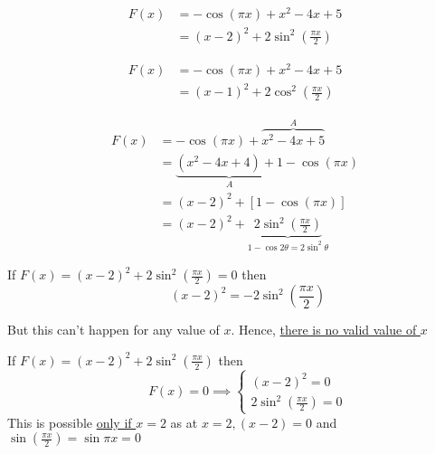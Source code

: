 \documentclass[14pt,fleqn]{extarticle}
\newcommand\expb{ \left(x-2 \right)^2 + 2\sin^2 \left(\frac{\pi x}{2} \right)}
\begin{document}
\begin{problem}
\begin{step}
  \begin{options} 
     \correct 
       \begin{align}
	F(x) &= -\cos \left(\pi x \right) + x^2 - 4x + 5 \\
	&= \left(x-2 \right)^2 + 2\sin^2 \left(\frac{\pi x}{2} \right)
\end{align}

\incorrect 

 \begin{align}
	F(x) &= -\cos \left(\pi x \right) + x^2 - 4x + 5 \\
	&= \left(x-1 \right)^2 + 2\cos^2 \left(\frac{\pi x}{2} \right)
\end{align}
        
    \end{options} 
     \reason 
       
       \begin{align}
       F(x) &=  -\cos \left(\pi x \right) + \overbrace{x^2 - 4x + 5}^{A} \\
       &= \underbrace{\left(x^2-4x+4 \right) + 1}_{A} -\cos \left(\pi x \right) \\
       &= \left(x-2 \right)^2 + \left[1-\cos \left(\pi x \right) \right] \\
       &= \left(x-2 \right)^2 + \underbrace{2\sin^2 \left(\frac{\pi x}{2} \right)}_{1-\cos 2\theta = 2\sin^2\theta}
\end{align}
\end{step}

\begin{step}
  \begin{options} 
       
     \incorrect 
     
     If $F(x) = \expb = 0$ then 
     \[ \qquad \left(x-2 \right)^2 = - 2\sin^2 \left(\frac{\pi x}{2} \right)\]
       
     But this can't happen for any value of $x$. Hence, \underline{there is no valid value of $x$} 
    
    \end{options} 

 \reason
     
     If $F(x) = \expb$ then 
     \[ \qquad F(x) = 0 \implies \begin{cases} 
     \left(x-2 \right)^2 = 0 \\
     2\sin^2 \left(\frac{\pi x}{2} \right) = 0
     \end{cases} \]
     This is possible \underline{only if $x = 2$} as at $x=2, \left(x-2 \right)=0$ and $\sin \left(\frac{\pi x}{2} \right) = \sin \pi x = 0$ 
       
\end{step}
\end{problem} 
\end{document}

